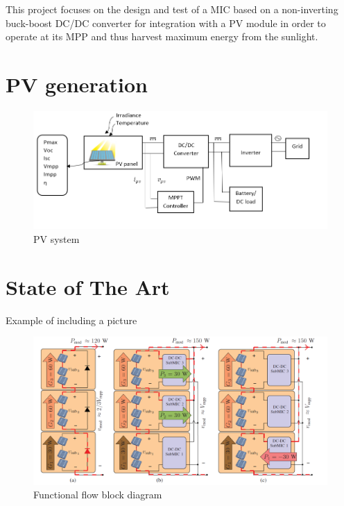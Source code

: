 This project focuses on the design and test of a MIC based on a non-inverting buck-boost DC/DC converter for integration with a PV module in order to operate at its MPP and thus harvest maximum energy from the sunlight. 

\section{PV generation}

\begin{figure}[htbp]
	\includegraphics[width=\linewidth]{../Pictures/PV_system_blocks}
	\caption{PV system}
	\label{fig:PVsystemblocks}
\end{figure}



\section{State of The Art}

Example of including a picture
\begin{figure}[htbp]
	\includegraphics[width=\linewidth]{../Pictures/test.png}
	\caption{Functional flow block diagram}
	\label{fig:TimePlan}
\end{figure}

